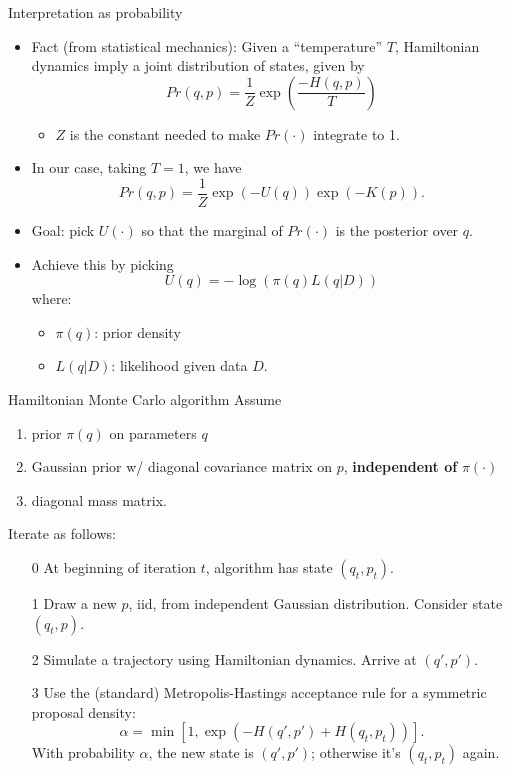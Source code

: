 \documentclass[aspectratio=169]{beamer}
\begin{document}
\begin{frame}{Interpretation as probability}
\begin{itemize}
	\item Fact (from statistical mechanics): Given a ``temperature'' $T$, Hamiltonian dynamics imply a joint distribution of states, given by 
$$ Pr(q,p) = \frac{1}{Z}\exp\left( \frac{-H(q,p)}{T} \right) $$
\begin{itemize}
	\item  $Z$ is the constant needed to make $Pr(\cdot)$ integrate to 1. \end{itemize}
	\item In our case, taking $T=1$, we have $$Pr(q,p) = \frac{1}{Z}\exp\left( -U(q) \right)\exp\left( -K(p) \right).$$
	\item Goal: pick $U(\cdot)$ so that the marginal of $Pr(\cdot)$ is the posterior over $q$.
	\item Achieve this by picking $$U(q) = -\log \left( \pi(q) L(q|D) \right)$$ where: \begin{itemize}
		\item $\pi(q)$: prior density
		\item $L(q|D)$: likelihood given data $D$.
	\end{itemize}
\end{itemize}
\end{frame}

\begin{frame}{Hamiltonian Monte Carlo algorithm}
Assume \begin{enumerate}
\item prior $\pi(q)$ on parameters $q$
\item Gaussian prior w/ diagonal covariance matrix on $p$, {\bf independent of} $\pi(\cdot)$
\item diagonal mass matrix.
\end{enumerate}
Iterate as follows:
\begin{enumerate}
	\item[0] At beginning of iteration $t$, algorithm has state $(q_t,p_t)$.
	\item[1] Draw a new $p$, iid, from independent Gaussian distribution.  Consider state $(q_t,p)$.
	\item[2] Simulate a trajectory using Hamiltonian dynamics.  Arrive at $(q',p')$.
	\item[3] Use the (standard) Metropolis-Hastings acceptance rule for a symmetric proposal density: 
	$$ \alpha = \min[1, \exp(-H(q',p') + H(q_t,p_t))].$$
	With probability $\alpha$, the new state is $(q',p')$; otherwise it's $(q_t,p_t)$ again.
\end{enumerate}
\end{frame}
\end{document}
